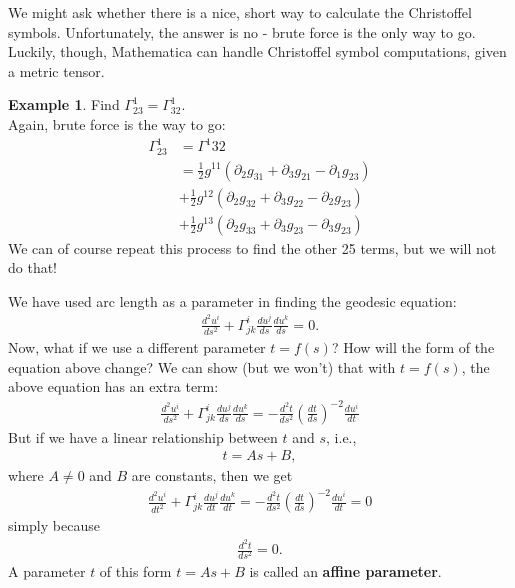 \documentclass{book}
\theoremstyle{definition}
\newtheorem{exmp}{Example}[section]
\begin{document}
We might ask whether there is a nice, short way to calculate the Christoffel symbols. Unfortunately, the answer is no - brute force is the only way to go. Luckily, though, Mathematica can handle Christoffel symbol computations, given a metric tensor. 
\begin{exmp}
	Find $\Gamma^{1}_{23} = \Gamma^1_{32}$.\\
	
	Again, brute force is the way to go:
	\begin{align*}
	\Gamma^{1}_{23} &= \Gamma^1{32}\\
	&= \frac{1}{2}g^{11}\left( \partial_2 g_{31} + \partial_3 g_{21} - \partial_1 g_{23}\right)\\
	&+ \frac{1}{2}g^{12}\left( \partial_2 g_{32} + \partial_3 g_{22} - \partial_2 g_{23}\right)\\
	&+
	\frac{1}{2}g^{13}\left( \partial_2 g_{33} + \partial_3 g_{23} - \partial_3 g_{23}\right)
	\end{align*}
	We can of course repeat this process to find the other 25 terms, but we will not do that!
\end{exmp}

We have used arc length as a parameter in finding the geodesic equation:
\begin{align*}
\frac{d^2u^i}{ds^2} + \Gamma^{i}_{jk}\frac{du^j}{ds}\frac{du^k}{ds} = 0.
\end{align*}
Now, what if we use a different parameter $t = f(s)$? How will the form of the equation above change? We can show (but we won't) that with $t = f(s)$, the above equation has an extra term:
\begin{align*}
\boxed{\frac{d^2u^i}{ds^2} + \Gamma^{i}_{jk}\frac{du^j}{ds}\frac{du^k}{ds} = -\frac{d^2t}{ds^2}\left( \frac{dt}{ds}\right)^{-2}\frac{du^i}{dt}}
\end{align*}
But if we have a linear relationship between $t$ and $s$, i.e.,
\begin{align*}
t = As +B,
\end{align*}
where $A\neq 0$ and $B$ are constants, then we get
\begin{align*}
\boxed{\frac{d^2u^i}{dt^2} + \Gamma^{i}_{jk}\frac{du^j}{dt}\frac{du^k}{dt} = -\frac{d^2t}{ds^2}\left( \frac{dt}{ds}\right)^{-2}\frac{du^i}{dt} = 0}
\end{align*}
simply because
\begin{align*}
\frac{d^2t}{ds^2} = 0.
\end{align*}
A parameter $t$ of this form $t = As + B$ is called an \textbf{affine parameter}. 
\end{document}
